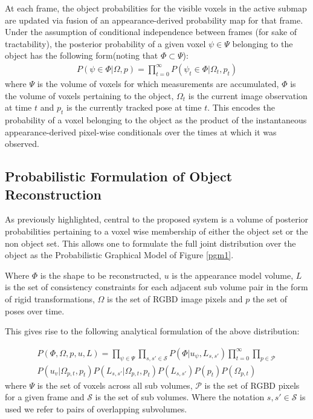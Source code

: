 At each frame, the object probabilities for the visible voxels in the active submap are updated via fusion of an appearance-derived probability map for that frame. Under the assumption of conditional independence between frames (for sake of tractability), the posterior probability of a given voxel $\psi \in \Psi$ belonging to the object has the following form(noting that $\Phi \subset \Psi$):
\begin{equation}
\begin{split}
P(\psi \in \Phi | \Omega, p) = \prod_{t=0}^{\infty} P(\psi_{t} \in \Phi | \Omega_{t}, p_{t})
\end{split}
\end{equation}
where $\Psi$ is the volume of voxels for which measurements are accumulated, $\Phi$ 
is the volume of voxels pertaining to the object, $\Omega_{t}$ is the current image observation at time $t$ and $p_{t}$ is the 
currently tracked pose at time $t$.
This encodes the probability of a voxel belonging to the object as the product of the instantaneous appearance-derived pixel-wise conditionals over the times at which it was observed.

\subsection{Probabilistic Formulation of Object Reconstruction}
As previously highlighted, central to the proposed system is a volume of posterior probabilities pertaining to a voxel wise membership of either the 
object set or the non object set. This allows one to formulate the full joint distribution over the object as the Probabilistic 
Graphical Model of Figure \ref{pgm1}.

Where $\Phi$ is the shape to be reconstructed, $u$ is the appearance model volume, $L$ is the 
set of consistency constraints for each adjacent sub volume pair in the form of rigid transformations, $\Omega$ is the set of 
RGBD image pixels and $p$ the set of poses over time.

This gives rise to the following analytical formulation of the above distribution:

\begin{equation}
\begin{split}
P(\Phi, \Omega, p, u, L) = 
\prod_{\psi \in \Psi}\prod_{s, s' \in \mathcal{S}}P(\Phi|u_{\psi}, L_{s, s'}) 
\prod_{t=0}^{\infty}\prod_{p \in \mathcal{P}}\\
P(u_{v}|\Omega_{p, t}, p_{t})
P(L_{s, s'}|\Omega_{p, t}, p_{t})
P(L_{s, s'})P(p_{t})P(\Omega_{p, t})
\end{split}
\end{equation}
where $\Psi$ is the set of voxels across all sub volumes, $\mathcal{P}$ is the set of RGBD pixels for a given 
frame and $\mathcal{S}$ is the set of sub volumes. Where the notation $s, s' \in \mathcal{S}$ is used we refer to pairs of overlapping subvolumes.

